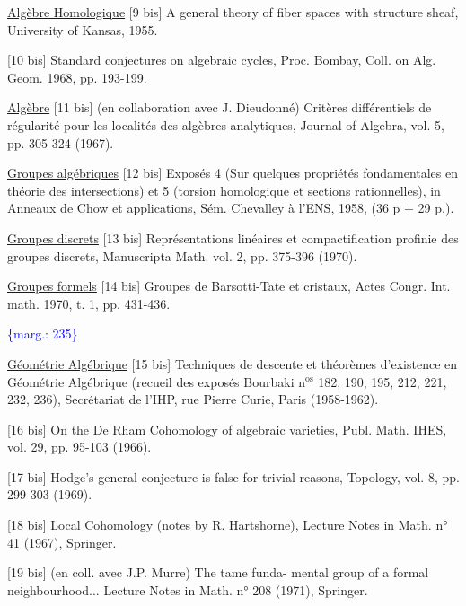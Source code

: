 \documentclass[11pt]{article}
\newcommand{\scanpage}[1]{\par\bigskip\noindent{\small\sffamily[scan #1]}\par}
\newcommand{\mspage}[1]{{\small\sffamily[p.\,#1]}}
\newcommand{\margin}[1]{\textcolor{blue}{\{\textsf{marg.:} #1\}}}
\newcommand{\uline}[1]{\underline{#1}}
\begin{document}
\uline{Algèbre Homologique}
[9 bis] A general theory of fiber spaces with structure
sheaf, University of Kansas, 1955.

[10 bis] Standard conjectures on algebraic cycles, Proc.
Bombay, Coll. on Alg. Geom. 1968, pp. 193-199.

\uline{Algèbre}
[11 bis] (en collaboration avec J. Dieudonné) Critères
différentiels de régularité pour les localités
des algèbres analytiques, Journal of Algebra,
vol. 5, pp. 305-324 (1967).

\uline{Groupes algébriques}
[12 bis] Exposés 4 (Sur quelques propriétés fondamentales
en théorie des intersections) et 5 (torsion
homologique et sections rationnelles), in
Anneaux de Chow et applications, Sém. Chevalley
à l'ENS, 1958, (36 p + 29 p.).

\uline{Groupes discrets}
[13 bis] Représentations linéaires et compactification
profinie des groupes discrets, Manuscripta
Math. vol. 2, pp. 375-396 (1970).

\uline{Groupes formels}
[14 bis] Groupes de Barsotti-Tate et cristaux, Actes
Congr. Int. math. 1970, t. 1, pp. 431-436.

\margin{235}

\clearpage
\scanpage{119/236}
\mspage{- 23 -}

\uline{Géométrie Algébrique}
[15 bis] Techniques de descente et théorèmes d'existence
en Géométrie Algébrique (recueil des exposés
Bourbaki n$^{\text{os}}$ 182, 190, 195, 212, 221, 232,
236), Secrétariat de l'IHP, rue Pierre Curie,
Paris (1958-1962).

[16 bis] On the De Rham Cohomology of algebraic varieties,
Publ. Math. IHES, vol. 29, pp. 95-103 (1966).

[17 bis] Hodge's general conjecture is false for
trivial reasons, Topology, vol. 8,
pp. 299-303 (1969).

[18 bis] Local Cohomology (notes by R. Hartshorne),
Lecture Notes in Math. n° 41 (1967), Springer.

[19 bis] (en coll. avec J.P. Murre) The tame funda-%
mental group of a formal neighbourhood...
Lecture Notes in Math. n° 208 (1971), Springer.
\end{document}

